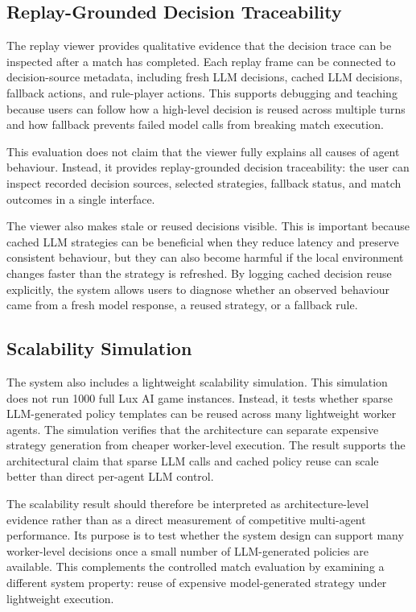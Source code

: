\documentclass[11pt]{article}
\begin{document}
\subsection{Replay-Grounded Decision Traceability}

The replay viewer provides qualitative evidence that the decision trace can be inspected after a match has completed. Each replay frame can be connected to decision-source metadata, including fresh LLM decisions, cached LLM decisions, fallback actions, and rule-player actions. This supports debugging and teaching because users can follow how a high-level decision is reused across multiple turns and how fallback prevents failed model calls from breaking match execution.

This evaluation does not claim that the viewer fully explains all causes of agent behaviour. Instead, it provides replay-grounded decision traceability: the user can inspect recorded decision sources, selected strategies, fallback status, and match outcomes in a single interface.

The viewer also makes stale or reused decisions visible. This is important because cached LLM strategies can be beneficial when they reduce latency and preserve consistent behaviour, but they can also become harmful if the local environment changes faster than the strategy is refreshed. By logging cached decision reuse explicitly, the system allows users to diagnose whether an observed behaviour came from a fresh model response, a reused strategy, or a fallback rule.

\subsection{Scalability Simulation}

The system also includes a lightweight scalability simulation. This simulation does not run 1000 full Lux AI game instances. Instead, it tests whether sparse LLM-generated policy templates can be reused across many lightweight worker agents. The simulation verifies that the architecture can separate expensive strategy generation from cheaper worker-level execution. The result supports the architectural claim that sparse LLM calls and cached policy reuse can scale better than direct per-agent LLM control.

The scalability result should therefore be interpreted as architecture-level evidence rather than as a direct measurement of competitive multi-agent performance. Its purpose is to test whether the system design can support many worker-level decisions once a small number of LLM-generated policies are available. This complements the controlled match evaluation by examining a different system property: reuse of expensive model-generated strategy under lightweight execution.
\end{document}
